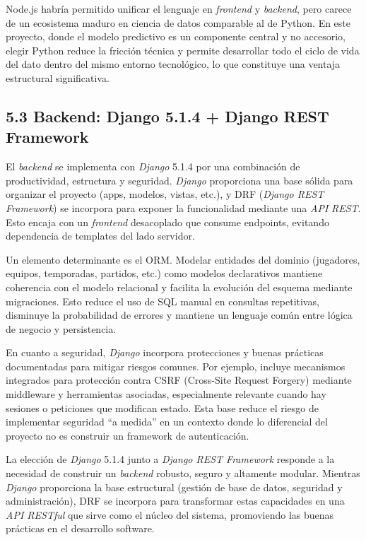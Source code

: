 Node.js habría permitido unificar el lenguaje en \textit{frontend} y \textit{backend}, pero carece de un ecosistema 
maduro en ciencia de datos comparable al de Python. En este proyecto, donde el modelo predictivo es 
un componente central y no accesorio, elegir Python reduce la fricción técnica y permite desarrollar 
todo el ciclo de vida del dato dentro del mismo entorno tecnológico, lo que constituye una ventaja 
estructural significativa.

\subsection{5.3 Backend: Django 5.1.4 + Django REST Framework}

El \textit{backend} se implementa con \textit{Django} 5.1.4 por una combinación de productividad, estructura y 
seguridad. \textit{Django} proporciona una base sólida para organizar el proyecto (apps, modelos, vistas, 
etc.), y DRF (\textit{Django REST Framework}) se incorpora para exponer la funcionalidad mediante una \textit{API} 
\textit{REST}. Esto encaja con un \textit{frontend} desacoplado que consume endpoints, evitando dependencia 
de templates del lado servidor.

Un elemento determinante es el ORM. Modelar entidades del dominio (jugadores, equipos, temporadas, 
partidos, etc.) como modelos declarativos mantiene coherencia con el modelo relacional y facilita 
la evolución del esquema mediante migraciones. Esto reduce el uso de SQL manual en consultas 
repetitivas, disminuye la probabilidad de errores y mantiene un lenguaje común entre lógica de 
negocio y persistencia.

En cuanto a seguridad, \textit{Django} incorpora protecciones y buenas prácticas documentadas para mitigar riesgos 
comunes. Por ejemplo, incluye mecanismos integrados para protección contra CSRF (Cross‑Site Request 
Forgery) mediante middleware y herramientas asociadas, especialmente relevante cuando hay sesiones 
o peticiones que modifican estado. Esta base reduce el riesgo de implementar seguridad ``a medida'' 
en un contexto donde lo diferencial del proyecto no es construir un framework de autenticación.

La elección de \textit{Django} 5.1.4 junto a \textit{Django REST Framework} responde a la necesidad de construir un 
\textit{backend} robusto, seguro y altamente modular. Mientras \textit{Django} proporciona la base estructural (gestión 
de base de datos, seguridad y administración), DRF se incorpora para transformar estas capacidades 
en una \textit{API RESTful} que sirve como el núcleo del sistema, promoviendo las buenas prácticas en el 
desarrollo software.

